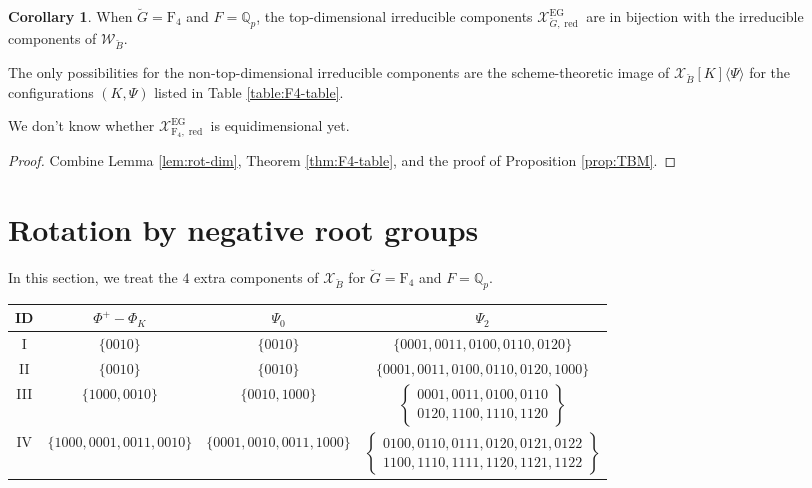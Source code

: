 \documentclass[11pt]{amsart}
\theoremstyle{definition}
\newtheorem{cor}[thm]{Corollary}
\newcommand{\Q}{\mathbb{Q}}
\newcommand{\cX}{\mathcal{X}}
\newcommand{\cW}{\mathcal{W}}
\newcommand{\bG}{\breve{G}}
\newcommand{\bB}{\breve{B}}
\DeclareMathOperator{\EG}{EG}
\DeclareMathOperator{\red}{red}
\begin{document}
\begin{cor}
When $\bG=\mathrm{F}_4$ and $F=\Q_p$,
the top-dimensional irreducible components
$\cX_{\bG, \red}^{\EG}$
are in bijection with the irreducible components
of $\cW_{\bB}$.

The only possibilities
for the non-top-dimensional irreducible components
are the scheme-theoretic image
of $\cX_{\bB}[K]\langle \Psi\rangle$
for the configurations $(K, \Psi)$
listed in Table \ref{table:F4-table}.
\label{cor:baby-F4}
\end{cor}

We don't know whether 
$\cX_{\mathrm{F}_4, \red}^{\EG}$
is equidimensional yet.

\begin{proof}
Combine 
Lemma \ref{lem:rot-dim},
Theorem 
\ref{thm:F4-table},
and the proof of Proposition \ref{prop:TBM}.
\end{proof}



\section{Rotation by negative root groups}
\label{sec:rotate}
In this section, we treat the $4$ extra components
of $\cX_{\bB}$ for $\bG=\mathrm{F}_4$ and $F=\Q_p$.

\begin{table}[H]
\centering
\scriptsize
\begin{tabular}{|c|c|c|c|}
\hline
ID & $\Phi^+-\Phi_K$ & $\Psi_0$ & $\Psi_2$ \\
\hline
I & $\{0010\}$ & $\{0010\}$ & $\{0001,0011,0100,0110,0120\}$ \\
II & $\{0010\}$ & $\{0010\}$ & $\{0001,0011,0100,0110,0120,1000\}$ \\
III & $\{1000,0010\}$ & $\{0010,1000\}$ & $\left\{ \begin{matrix} 0001,0011,0100,0110 \\ 0120,1100,1110,1120 \end{matrix} \right\}$ \\
IV & $\{1000,0001,0011,0010\}$ & $\{0001,0010,0011,1000\}$ & $\left\{ \begin{matrix} 0100,0110,0111,0120,0121,0122 \\ 1100,1110,1111,1120,1121,1122 \end{matrix} \right\}$ \\
\hline
\end{tabular}
\end{table}
\end{document}
